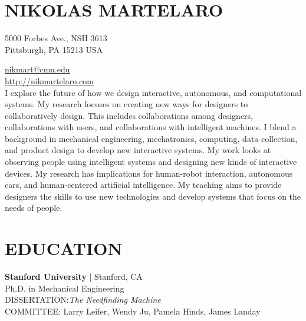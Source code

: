 \documentclass[11pt]{article} %
\begin{document}

\section*{NIKOLAS MARTELARO}

5000 Forbes Ave., NSH 3613 \\ 
Pittsburgh, PA 15213 USA


\href{mailto:nikmart@cmu.edu}{nikmart@cmu.edu}\\ %
\href{http://nikmartelaro.com}{http://nikmartelaro.com}\\ %
\bigskip\bigskip %
I explore the future of how we design interactive, autonomous, and computational systems. 
My research focuses on creating new ways for designers to collaboratively design. 
This includes collaborations among designers, collaborations with users, and collaborations with intelligent machines. 
I blend a background in mechanical engineering, mechatronics, computing, data collection, and product design to develop new interactive systems.
My work looks at observing people using intelligent systems and designing new kinds of interactive devices. 
My research has implications for human-robot interaction, autonomous cars, and human-centered artificial intelligence. 
My teaching aims to provide designers the skills to use new technologies and develop systems that focus on the needs of people.

\section*{EDUCATION}

\textbf{Stanford University} | Stanford, CA\\
Ph.D. in Mechanical Engineering\\
DISSERTATION:\emph{The Needfinding Machine}\\
COMMITTEE: Larry Leifer, Wendy Ju, Pamela Hinds, James Landay
\medskip 
\end{document}
